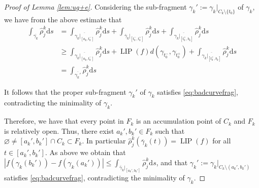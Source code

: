 \documentclass{amsart}
\numberwithin{equation}{section}
\newcommand{\LIP}{\operatorname{LIP}}
\newcommand{\ud}{\mathrm {d}}
\begin{document}
\begin{proof}[Proof of Lemma \ref{lem:ug+e}]
Considering the sub-fragment $\gamma_k':=\gamma_k|_{C_k\setminus \{t_0\}}$ of $\gamma_k$, we have from the above estimate that
\begin{align*}
\int_{\overline{\gamma_k}}\widehat\rho_j^k\ud s&=\int_{\overline{\gamma_k|_{[a_k,t_0^-]}}}\widehat\rho_j^k\ud s+\int_{\overline\gamma_k|_{[t_0^-,t_0^+]}}\widehat \rho_j^k\ud s+\int_{\overline{\gamma_k|_{[t_0^+,b_k]}}}\widehat\rho_j^k\ud s\\
&\ge \int_{\overline{\gamma_k|_{[a_k,t_0^-]}}}\widehat\rho_j^k\ud s+\LIP(f)d(\gamma_{t_0^-},\gamma_{t_0^+})+\int_{\overline{\gamma_k|_{[t_0^+,b_k]}}}\widehat\rho_j^k\ud s\\
&=\int_{\overline{\gamma_k'}}\widehat\rho_j^k\ud s
\end{align*}

\noindent It follows that the proper sub-fragment $\gamma_k'$ of $\gamma_k$ satisfies \eqref{eq:badcurvefrag}, contradicting the minimality of $\gamma_k$. 


Therefore, we have that every point in $F_k$ is an accumulation point of $C_k$ and $F_k$ is relatively open. Thus, there exist $a_k',b_k'\in F_k$ such that $\varnothing\ne [a_k',b_k']\cap C_k\subset F_k$. In particular $\widehat\rho_j^k(\overline\gamma_k(t))=\LIP(f)$ for all $t\in [a_k',b_k']$. As above we obtain that $|f(\gamma_k(b_k'))-f(\gamma_k(a_k'))|\le \int_{\overline\gamma_k|_{[a_k',b_k']}}\widehat \rho_j^k\ud s$, and that $\gamma_k':=\gamma_k|_{C_k\setminus(a_k',b_k')}$ satisfies \eqref{eq:badcurvefrag}, contradicting the minimality of $\gamma_k$.
 

\end{proof}
\end{document}
